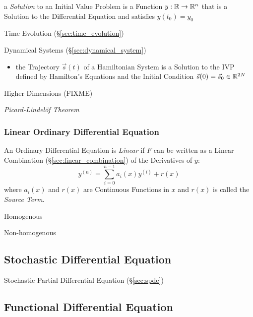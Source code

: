 a \emph{Solution} to an Initial Value Problem is a Function $y : \mathbb{R}
\rightarrow \mathbb{R}^n$ that is a Solution to the Differential Equation and
satisfies $y(t_0) = y_0$

\fist Time Evolution (\S\ref{sec:time_evolution})

\fist Dynamical Systems (\S\ref{sec:dynamical_system})

\begin{itemize}
  \item the Trajectory $\vec{s}(t)$ of a Hamiltonian System is a Solution to
    the IVP defined by Hamilton's Equations and the Initial Condition
    $\vec{s}(0) = \vec{s}_0 \in \mathbb{R}^{2N}$
\end{itemize}

Higher Dimensions (FIXME)

\emph{Picard-Lindel\"of Theorem}



\subsubsection{Linear Ordinary Differential Equation}\label{sec:linear_ode}

An Ordinary Differential Equation is \emph{Linear} if $F$ can be written as a
Linear Combination (\S\ref{sec:linear_combination}) of the Derivatives of $y$:
\[
  y^{(n)} = \sum_{i=0}^{n-1} a_i(x)y^{(i)} + r(x)
\]
where $a_i(x)$ and $r(x)$ are Continuous Functions in $x$ and $r(x)$ is called
the \emph{Source Term}.

Homogenous

Non-homogenous



\subsection{Stochastic Differential Equation}\label{sec:sde}

\fist Stochastic Partial Differential Equation (\S\ref{sec:spde})



\subsection{Functional Differential Equation}\label{sec:fde}

